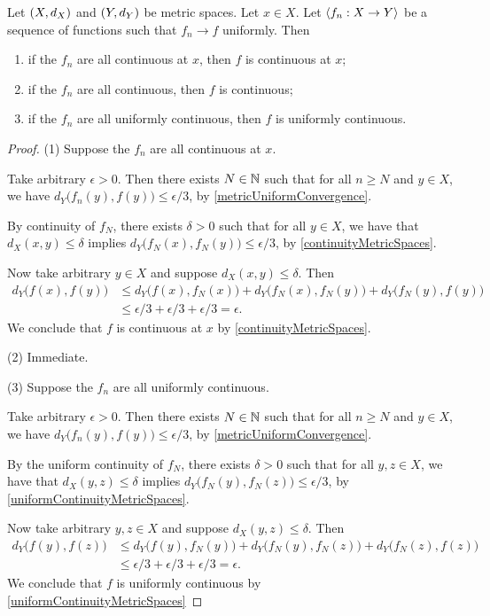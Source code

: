 \begin{proposition} \label{uniformLimitTheorem}
Let $\sSet{X, d_X}$ and $\sSet{Y,d_Y}$ be metric spaces. Let $x\in X$. Let $\left\langle f_n: X\to Y \right\rangle$ be a sequence of functions such that $f_n \to f$ uniformly. Then
\begin{enumerate}
\item if the $f_n$ are all continuous at $x$, then $f$ is continuous at $x$;
\item if the $f_n$ are all continuous, then $f$ is continuous;
\item if the $f_n$ are all uniformly continuous, then $f$ is uniformly continuous.
\end{enumerate}
\end{proposition}
\begin{proof}
(1) Suppose the $f_n$ are all continuous at $x$.

Take arbitrary $\epsilon > 0$. Then there exists $N\in \mathbb{N}$ such that for all $n\geq N$ and $y\in X$, we have $d_Y\big(f_n(y), f(y)\big) \leq \epsilon/3$, by \ref{metricUniformConvergence}.

By continuity of $f_N$, there exists $\delta > 0$ such that for all $y\in X$, we have that $d_X(x,y) \leq \delta$ implies $d_Y\big(f_N(x), f_N(y)\big) \leq \epsilon/3$, by \ref{continuityMetricSpaces}.

Now take arbitrary $y\in X$ and suppose $d_X(x,y) \leq \delta$. Then
\begin{align*}
d_Y\big(f(x), f(y)\big) &\leq d_Y\big(f(x), f_N(x)\big) + d_Y\big(f_N(x), f_N(y)\big) + d_Y\big(f_N(y), f(y)\big) \\
&\leq \epsilon / 3 + \epsilon / 3 + \epsilon / 3 = \epsilon.
\end{align*}
We conclude that $f$ is continuous at $x$ by \ref{continuityMetricSpaces}.

(2) Immediate.

(3) Suppose the $f_n$ are all uniformly continuous.

Take arbitrary $\epsilon > 0$. Then there exists $N\in \mathbb{N}$ such that for all $n\geq N$ and $y\in X$, we have $d_Y\big(f_n(y), f(y)\big) \leq \epsilon/3$, by \ref{metricUniformConvergence}.

By the uniform continuity of $f_N$, there exists $\delta > 0$ such that for all $y,z\in X$, we have that $d_X(y, z) \leq \delta$ implies $d_Y\big(f_N(y), f_N(z)\big) \leq \epsilon/3$, by \ref{uniformContinuityMetricSpaces}.

Now take arbitrary $y,z\in X$ and suppose $d_X(y,z) \leq \delta$. Then
\begin{align*}
d_Y\big(f(y), f(z)\big) &\leq d_Y\big(f(y), f_N(y)\big) + d_Y\big(f_N(y), f_N(z)\big) + d_Y\big(f_N(z), f(z)\big) \\
&\leq \epsilon / 3 + \epsilon / 3 + \epsilon / 3 = \epsilon.
\end{align*}
We conclude that $f$ is uniformly continuous by \ref{uniformContinuityMetricSpaces}
\end{proof}
